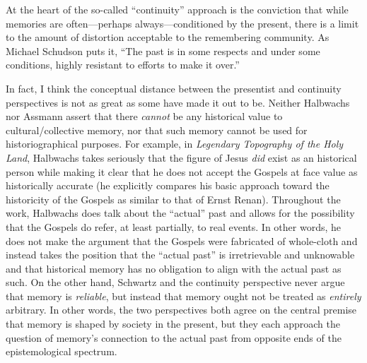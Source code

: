At the heart of the so-called ``continuity'' approach is the conviction
that while memories are often---perhaps always---conditioned by the
present, there is a limit to the amount of distortion acceptable to the
remembering community. As Michael Schudson puts it, ``The past is in
some respects and under some conditions, highly resistant to efforts to
make it over.''\autocite[107]{schudson_communication1989}

In fact, I think the conceptual distance between the presentist and
continuity perspectives is not as great as some have made it out to be.
Neither Halbwachs nor Assmann assert that there \emph{cannot} be any
historical value to cultural/collective memory, nor that such memory
cannot be used for historiographical purposes. For example, in
\emph{Legendary Topography of the Holy Land}, Halbwachs takes seriously
that the figure of Jesus \emph{did} exist as an historical person while
making it clear that he does not accept the Gospels at face value as
historically accurate (he explicitly compares his basic approach toward
the historicity of the Gospels as similar to that of Ernst Renan).
Throughout the work, Halbwachs does talk about the ``actual'' past and
allows for the possibility that the Gospels do refer, at least
partially, to real events. In other words, he does not make the argument
that the Gospels were fabricated of whole-cloth and instead takes the
position that the ``actual past'' is irretrievable and unknowable and
that historical memory has no obligation to align with the actual past
as such. On the other hand, Schwartz and the continuity perspective
never argue that memory is \emph{reliable}, but instead that memory
ought not be treated as \emph{entirely} arbitrary. In other words, the
two perspectives both agree on the central premise that memory is shaped
by society in the present, but they each approach the question of
memory's connection to the actual past from opposite ends of the
epistemological spectrum.

